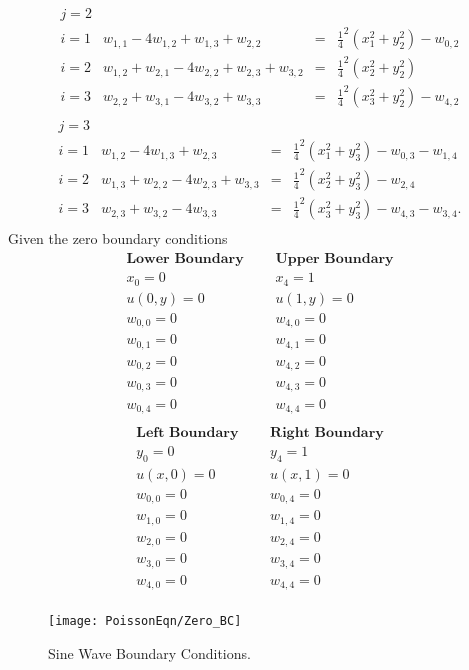 \[\begin{array}{l|rcl}
j=2\\
i=1&w_{1,1}-4w_{1,2}+w_{1,3}+w_{2,2}&=&\frac{1}{4}^2(x_1^2+y_2^2)-w_{0,2}\\
i=2&w_{1,2}+w_{2,1}-4w_{2,2}+w_{2,3}+w_{3,2}&=&\frac{1}{4}^2(x_2^2+y_2^2)\\
i=3&w_{2,2}+w_{3,1}-4w_{3,2}+w_{3,3}&=&\frac{1}{4}^2(x_3^2+y_2^2)-w_{4,2}\\
\end{array}
\]	
\[\begin{array}{l|rcl}
j=3\\
i=1&w_{1,2}-4w_{1,3}+w_{2,3}&=&\frac{1}{4}^2(x_1^2+y_3^2)-w_{0,3}-w_{1,4}\\
i=2&w_{1,3}+w_{2,2}-4w_{2,3}+w_{3,3}&=&\frac{1}{4}^2(x_2^2+y_3^2)-w_{2,4}\\
i=3&w_{2,3}+w_{3,2}-4w_{3,3}&=&\frac{1}{4}^2(x_3^2+y_3^2)-w_{4,3}-w_{3,4}.\\
\end{array}
\]	
Given the zero boundary conditions
\[
\begin{array}{lcl}
\textbf{Lower Boundary}&\ \ \ & \textbf{Upper Boundary} \\
x_0=0&\ \ \ & x_4=1\\
u(0,y)=0&\ \ \ & u(1,y)=0\\
w_{0,0}=0 &\ \ \ & w_{4,0}=0 \\ 
w_{0,1}=0& \ \ \ & w_{4,1}=0 \\
w_{0,2}=0 & \ \ \ & w_{4,2}=0  \\
w_{0,3}=0& \ \ \ & w_{4,3}=0  \\
w_{0,4}=0 & \ \ \ & w_{4,4}=0  \\

\end{array}
\]
\[
\begin{array}{lcl}
\textbf{Left Boundary}&\ \ \ & \textbf{Right Boundary} \\
y_0=0&\ \ \ & y_4=1 \\
u(x,0)=0&\ \ \ & u(x,1)=0 \\

w_{0,0}=0 & \ \ \ & w_{0,4}=0\\ 
w_{1,0}=0  & \ \ \ & w_{1,4}=0 \\
w_{2,0}=0  & \ \ \ & w_{2,4}=0 \\
w_{3,0}=0  & \ \ \ & w_{3,4}=0 \\
w_{4,0}=0  & \ \ \ & w_{4,4}=0 \\

\end{array}
\]
\begin{figure}[H]
  \caption{Sine Wave Boundary Conditions.}\label{Sine_waveBC}
  \centering
    \texttt{[image: PoissonEqn/Zero\_BC]}
\end{figure}

